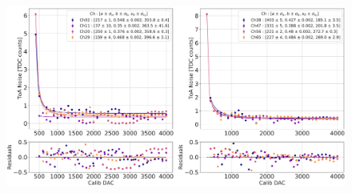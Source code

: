 \begin{figure}
    \centering
    \includegraphics[width=0.75\linewidth]{Figures/HGCAL/ToANoise_Injection.pdf}
    \caption{}
    \label{fig:TOANoise_Injection}
\end{figure}





